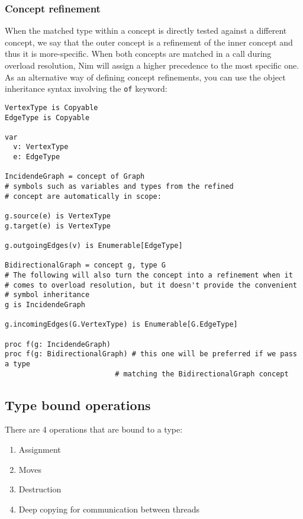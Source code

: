 \hypertarget{concept-refinement}{%
\subsubsection{Concept refinement}\label{concept-refinement}}

When the matched type within a concept is directly tested against a
different concept, we say that the outer concept is a refinement of the
inner concept and thus it is more-specific. When both concepts are
matched in a call during overload resolution, Nim will assign a higher
precedence to the most specific one. As an alternative way of defining
concept refinements, you can use the object inheritance syntax involving
the \texttt{of} keyword:

\begin{verbatim}
VertexType is Copyable
EdgeType is Copyable

var
  v: VertexType
  e: EdgeType

IncidendeGraph = concept of Graph
# symbols such as variables and types from the refined
# concept are automatically in scope:

g.source(e) is VertexType
g.target(e) is VertexType

g.outgoingEdges(v) is Enumerable[EdgeType]

BidirectionalGraph = concept g, type G
# The following will also turn the concept into a refinement when it
# comes to overload resolution, but it doesn't provide the convenient
# symbol inheritance
g is IncidendeGraph

g.incomingEdges(G.VertexType) is Enumerable[G.EdgeType]

proc f(g: IncidendeGraph)
proc f(g: BidirectionalGraph) # this one will be preferred if we pass a type
                          # matching the BidirectionalGraph concept
\end{verbatim}

\hypertarget{type-bound-operations}{%
\subsection{Type bound operations}\label{type-bound-operations}}

There are 4 operations that are bound to a type:

\begin{enumerate}
\def\labelenumi{\arabic{enumi}.}
\tightlist
\item
  Assignment
\item
  Moves
\item
  Destruction
\item
  Deep copying for communication between threads
\end{enumerate}

